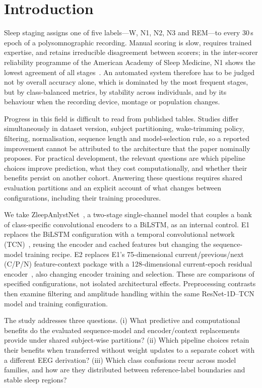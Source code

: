\documentclass[11pt,a4paper]{article}
\begin{document}
\section{Introduction}

Sleep staging assigns one of five labels---W, N1, N2, N3 and REM---to every 30\,s epoch of a
polysomnographic recording. Manual scoring is slow, requires trained expertise, and retains
irreducible disagreement between scorers; in the inter-scorer reliability programme of the American
Academy of Sleep Medicine, N1 shows the lowest agreement of all stages~\cite{rosenberg2013aasm}. An
automated system therefore has to be judged not by overall accuracy alone, which is dominated by the
most frequent stages, but by class-balanced metrics, by stability across individuals, and by its
behaviour when the recording device, montage or population changes.

Progress in this field is difficult to read from published tables. Studies differ simultaneously in
dataset version, subject partitioning, wake-trimming policy, filtering, normalisation, sequence length
and model-selection rule, so a reported improvement cannot be attributed to the architecture that the
paper nominally proposes. For practical development, the relevant questions are which pipeline choices
improve prediction, what they cost computationally, and whether their benefits persist on another cohort.
Answering these questions requires shared evaluation partitions and an explicit account of what changes
between configurations, including their training procedures.

We take ZleepAnlystNet~\cite{jadhav2024zleepanlystnet}, a two-stage single-channel model that couples a
bank of class-specific convolutional encoders to a BiLSTM, as an internal control. E1 replaces the
BiLSTM configuration with a temporal convolutional network (TCN)~\cite{bai2018tcn}, reusing the encoder
and cached features but changing the sequence-model training recipe. E2 replaces E1's 75-dimensional
current/previous/next (C/P/N) feature-context package with a 128-dimensional current-epoch residual
encoder~\cite{he2016resnet}, also changing encoder training and selection. These are comparisons of
specified configurations, not isolated architectural effects. Preprocessing contrasts then examine
filtering and amplitude handling within the same ResNet-1D--TCN model and training configuration.

The study addresses three questions. (i) What predictive and computational benefits do the evaluated
sequence-model and encoder/context replacements provide under shared subject-wise partitions?
(ii) Which pipeline choices retain their benefits when transferred without weight updates to a separate
cohort with a different EEG derivation? (iii) Which class confusions recur across model families, and
how are they distributed between reference-label boundaries and stable sleep regions?
\end{document}
